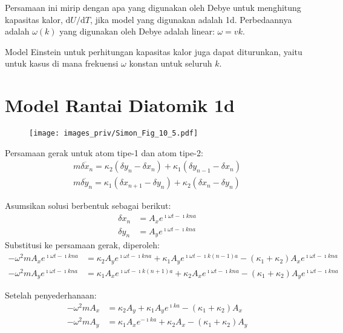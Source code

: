 Persamaan ini mirip dengan apa yang digunakan oleh Debye untuk
menghitung kapasitas kalor, $\mathrm{d}U/\mathrm{d}T$, jika model yang
digunakan adalah 1d. Perbedaannya adalah $\omega(k)$ yang digunakan
oleh Debye adalah linear: $\omega = vk$.

Model Einstein untuk perhitungan kapasitas kalor juga dapat diturunkan,
yaitu untuk kasus di mana frekuensi $\omega$ konstan untuk seluruh
$k$.


\section{Model Rantai Diatomik 1d}


\begin{figure}[h]
{\centering
\texttt{[image: images\_priv/Simon\_Fig\_10\_5.pdf]}
\par}
\end{figure}

Persamaan gerak untuk atom tipe-1 dan atom tipe-2:
\begin{align}
m \ddot{\delta x_{n}} = \kappa_{2} ( \delta y_{n} - \delta x_{n} ) +
\kappa_{1} ( \delta y_{n-1} - \delta x_{n} ) \\
m \ddot{\delta y_{n}} = \kappa_{1} ( \delta x_{n+1} - \delta y_{n} ) +
\kappa_{2} ( \delta x_{n} - \delta y_{n} )
\end{align}

Asumsikan solusi berbentuk sebagai berikut:
\begin{align}
\delta x_{n} & = A_{x} e^{\imath \omega t - \imath kna} \\
\delta y_{n} & = A_{y} e^{\imath \omega t - \imath kna}
\end{align}
Substitusi ke persamaan gerak, diperoleh:
\begin{align}
-\omega^2 m A_{x} e^{\imath \omega t - \imath kna} & =
\kappa_{2} A_{y} e^{\imath \omega t - \imath kna} +
\kappa_{1} A_{y} e^{\imath \omega t - \imath k(n-1)a} -
(\kappa_{1} + \kappa_{2}) A_{x} e^{\imath \omega t - \imath kna} \\
-\omega^2 m A_{y} e^{\imath \omega t - \imath kna} & =
\kappa_{1} A_{x} e^{\imath \omega t - \imath k(n+1)a} +
\kappa_{2} A_{x} e^{\imath \omega t - \imath kna} -
(\kappa_{1} + \kappa_{2}) A_{y} e^{\imath \omega t - \imath kna}
\end{align}

Setelah penyederhanaan:
\begin{align}
-\omega^2 m A_{x} & = \kappa_{2} A_{y} + \kappa_{1} A_{y} e^{\imath ka} -
(\kappa_{1} + \kappa_{2})A_{x} \\
-\omega^2 m A_{y} & = \kappa_{1} A_{x} e^{-\imath k a} + \kappa_{2} A_{x} -
(\kappa_{1} + \kappa_{2})A_{y}
\end{align}


